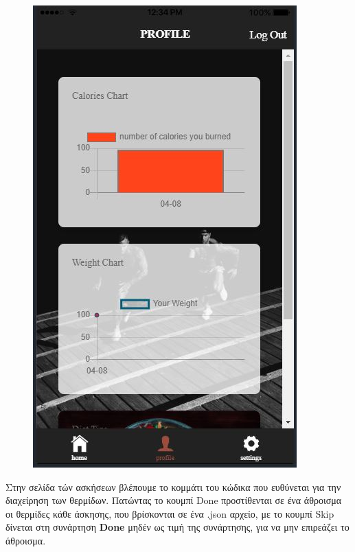\documentclass[a4paper,12pt]{article}
\begin{document}
\begin{figure}[!htb]
				  \includegraphics[width=\linewidth]{lesson5}
				\endminipage\hfill
			
			\end{figure}
			\vspace{.5cm}
			Στην σελίδα τών ασκήσεων βλέπουμε το κομμάτι του κώδικα που ευθύνεται για την διαχείρηση των θερμίδων. Πατώντας το κουμπί Done
			προστίθενται σε ένα άθροισμα οι θερμίδες κάθε άσκησης, που βρίσκονται σε ένα .json αρχείο, με το κουμπί Skip δίνεται στη συνάρτηση \textbf{Done}
			μηδέν ως τιμή της συνάρτησης, για να μην επιρεάζει το άθροισμα.
			\vspace{1cm}
\end{document}
